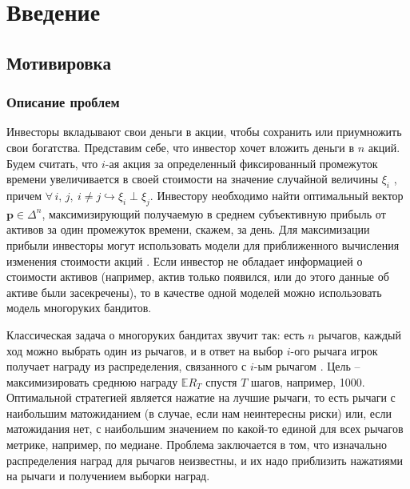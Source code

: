
\chapter{Введение} %

\label{Introduction} %

\newcommand{\tbf}[1]{\textbf{#1}}
\newcommand{\hook}{\hookrightarrow}
\newcommand{\bb}[1]{\mathbb{#1}}


\section{Мотивировка}

\subsection{Описание проблем}
\label{sec:problem_description}

Инвесторы вкладывают свои деньги в акции, чтобы сохранить или приумножить свои богатства. Представим себе, что инвестор хочет вложить деньги в $n$ акций. Будем считать, что $i$-ая акция за определенный фиксированный промежуток времени увеличивается в своей стоимости на значение случайной величины $\xi_i$ , причем $\forall \, i, \, j, \: i \neq j \hook \xi_i \perp \xi_j$. Инвестору необходимо найти оптимальный вектор $\tbf{p} \in \Delta^n$, максимизирующий получаемую в среднем субъективную прибыль от активов за один промежуток времени, скажем, за день. Для максимизации прибыли инвесторы могут использовать модели для приближенного вычисления изменения стоимости акций \cite{bouchaudpotters}. Если инвестор не обладает информацией о стоимости активов (например, актив только появился, или до этого данные об активе были засекречены), то в качестве одной моделей можно использовать модель многоруких бандитов.

Классическая задача о многоруких бандитах звучит так: есть $n$ рычагов, каждый ход можно выбрать один из рычагов, и в ответ на выбор $i$-ого рычага игрок получает награду из распределения, связанного с $i$-ым рычагом \cite{suttonbarto}. Цель -- максимизировать среднюю награду $\bb{E} R_T$ спустя $T$ шагов, например, 1000. Оптимальной стратегией является нажатие на лучшие рычаги, то есть рычаги с наибольшим матожиданием (в случае, если нам неинтересны риски) или, если матожидания нет, с наибольшим значением по какой-то единой для всех рычагов метрике, например, по медиане. Проблема заключается в том, что изначально распределения наград для рычагов неизвестны, и их надо приблизить нажатиями на рычаги и получением выборки наград.

